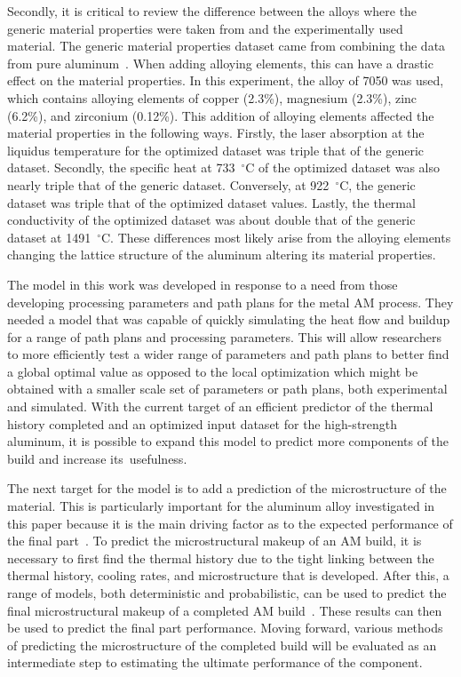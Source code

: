 \documentclass[metals,article,accept,pdftex,moreauthors]{Definitions/mdpi}
\begin{document}
Secondly, it is critical to review the difference between the alloys where the generic 
material properties were taken from and the experimentally used material.  The generic 
material properties dataset came from combining the data from pure 
aluminum~\cite{leitner_thermophysical_2017, boyden_temperature_2006}.  When adding 
alloying elements, this can have a drastic effect on the material properties.  In this 
experiment, the alloy of 7050 was used, which contains alloying elements of  copper 
(2.3\%), magnesium (2.3\%), zinc (6.2\%), and zirconium (0.12\%).  This addition of 
alloying elements affected the material properties in the following ways.  Firstly, the laser 
absorption at the liquidus temperature for the optimized dataset was triple that of the 
generic dataset.  Secondly, the specific heat at 733~$^{\circ}$C of the optimized dataset 
was also nearly triple that of the generic dataset. %
Conversely, at 
922~$^{\circ}$C, the generic dataset was triple that of the optimized dataset values.  Lastly, 
the thermal conductivity of the optimized dataset was about double that of the generic 
dataset at 1491~$^{\circ}$C.  These differences most likely arise from the alloying elements 
changing the lattice structure of the aluminum altering its material properties.

The model in this work was developed in response to a need from those developing processing parameters and path plans for the metal \ac{AM} process.  They needed a model that was capable of quickly simulating the heat flow and buildup for a range of path plans and processing parameters.
This will allow researchers to more efficiently test a wider range of parameters and path plans to better find a global optimal value as opposed to the local optimization which might be obtained with a smaller scale set of parameters or path plans, both experimental and simulated.
With the current target of an efficient predictor of the thermal history completed and an 
optimized input dataset for the high-strength aluminum, it is possible to expand this 
model to predict more components of the build and increase its~usefulness.

The next target for the model is to add a prediction of the microstructure of the material.  This is particularly important for the aluminum alloy investigated in this paper because it is the main driving factor as to the expected performance of the final part~\cite{guoMicrostructureMechanicalProperties2022}.
To predict the microstructural makeup of an \ac{AM} build, it is necessary to first find the thermal history due to the tight linking between the thermal history, cooling rates, and microstructure that is developed.  After this, a range of models, both deterministic and probabilistic, can be used to predict the final microstructural makeup of a completed \ac{AM} build~\cite{tanMicrostructureModellingMetallic2020}.  These results can then be used to predict the final part performance.  Moving forward, various methods of predicting the microstructure of the completed build will be evaluated as an intermediate step to estimating the ultimate performance of the component.
\end{document}
